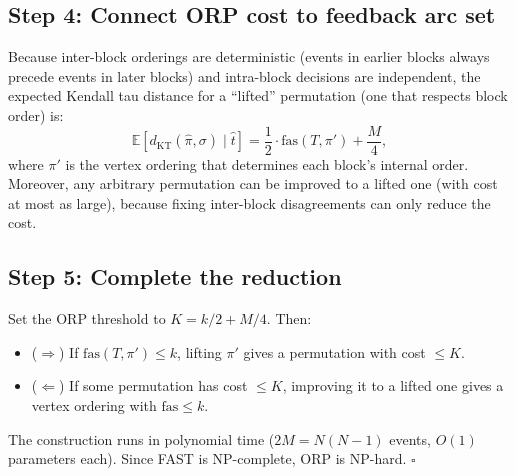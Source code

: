 \documentclass[11pt]{article}
\begin{document}
\subsection*{Step 4: Connect ORP cost to feedback arc set}

Because inter-block orderings are deterministic (events in earlier blocks always precede events in later blocks) and intra-block decisions are independent, the expected Kendall tau distance for a ``lifted'' permutation (one that respects block order) is:
\[
\mathbb{E}[d_{\mathrm{KT}}(\hat{\pi}, \sigma) \mid \hat{t}] = \frac{1}{2} \cdot \mathrm{fas}(T, \pi') + \frac{M}{4},
\]
where $\pi'$ is the vertex ordering that determines each block's internal order. Moreover, any arbitrary permutation can be improved to a lifted one (with cost at most as large), because fixing inter-block disagreements can only reduce the cost.

\subsection*{Step 5: Complete the reduction}

Set the ORP threshold to $K = k/2 + M/4$. Then:

\begin{itemize}
\item ($\Rightarrow$) If $\mathrm{fas}(T, \pi') \le k$, lifting $\pi'$ gives a permutation with cost $\le K$.
\item ($\Leftarrow$) If some permutation has cost $\le K$, improving it to a lifted one gives a vertex ordering with $\mathrm{fas} \le k$.
\end{itemize}

The construction runs in polynomial time ($2M = N(N-1)$ events, $O(1)$ parameters each). Since FAST is NP-complete, ORP is NP-hard. $\square$
\end{document}
